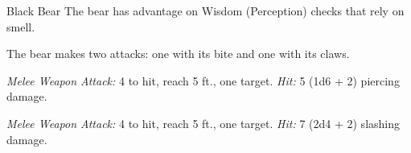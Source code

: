 \documentclass[10pt,a4paper,twoside,bg=print,twocolumn,openany,nodeprecatedcode]{dndbook}
\begin{document}
\begin{DndMonster}[float=t]{Black Bear}
\DndMonsterBasics[
armor-class = {11 (natural armor)},
hit-points = {\DndDice{3d8 + 6}},
speed = {40 ft., climb 30 ft.}
]
\DndMonsterAbilityScores[
 str = 15,
 dex = 10,
 con = 14,
 int = 2,
 wis = 12,
 cha = 7
]
\DndMonsterDetails[
skills = {Perception +3},
challenge = 1/2,
]
The bear has advantage on Wisdom (Perception) checks that rely on smell.

The bear makes two attacks: one with its bite and one with its claws.

\textsl{Melee Weapon Attack:} 4 to hit, reach 5 ft., one target. \textsl{Hit:} 5 (1d6 + 2) piercing damage.

\textsl{Melee Weapon Attack:} 4 to hit, reach 5 ft., one target. \textsl{Hit:} 7 (2d4 + 2) slashing damage.

\end{DndMonster}
\end{document}

